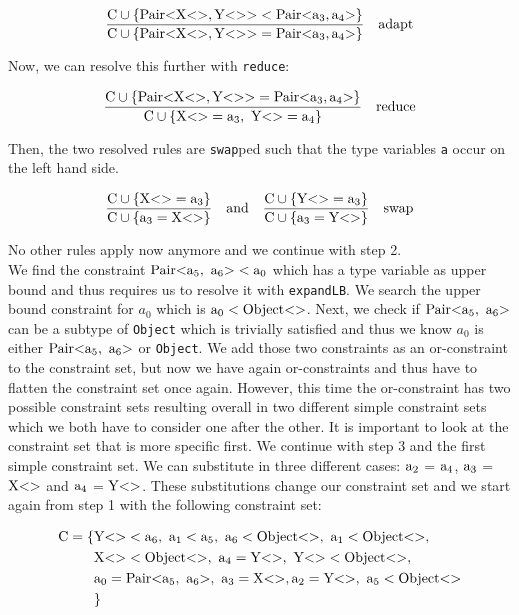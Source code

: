\begin{align*}
    \frac{\text{C} \cup \{ \text{Pair} \text{<} \text{X} \text{<}  \text{>}, \text{Y} \text{<}  \text{>} \text{>} < \text{Pair} \text{<} \text{a}_{3}, \text{a}_{4} \text{>} \} }{\text{C} \cup \{ \text{Pair} \text{<} \text{X} \text{<}  \text{>}, \text{Y} \text{<}  \text{>} \text{>} = \text{Pair} \text{<} \text{a}_{3}, \text{a}_{4} \text{>} \} } \quad \text{adapt}
\end{align*}

Now, we can resolve this further with \verb|reduce|:

\begin{align*}
    \frac{\cand \{ \nvtt{Pair}{\nvtt{X}{}, \nvtt{Y}{}} = \nvtt{Pair}{\fa{3}, \fa{4}} \} }{\cand \{ \nvtt{X}{} = \fa{3}, \ \nvtt{Y}{} = \fa{4} \} } \quad \text{reduce}
\end{align*}

Then, the two resolved rules are \verb|swap|ped such that the type variables \verb|a| occur on the left hand side.

\begin{align*}
    \frac{\text{C} \cup \{ \text{X} \text{<}  \text{>} = \text{a}_{3} \} }{\text{C} \cup \{ \text{a}_{3} = \text{X} \text{<}  \text{>} \} } \quad \text{and} \quad \frac{\text{C} \cup \{ \text{Y} \text{<}  \text{>} = \text{a}_{3} \} }{\text{C} \cup \{ \text{a}_{3} = \text{Y} \text{<}  \text{>} \} } \quad \text{swap}
\end{align*}

No other rules apply now anymore and we continue with step 2.\\

We find the constraint $\nvtt{Pair}{\fa{5}, \ \fa{6}} < \fa{0}$ which has a type variable as upper bound and thus requires us to resolve it with \verb|expandLB|. We search the upper bound constraint for $a_0$ which is $\text{a}_{0} < \text{Object} \text{<}  \text{>}$.
Next, we check if $\nvtt{Pair}{\fa{5}, \ \fa{6}}$ can be a subtype of \verb|Object| which is trivially satisfied and thus we know $a_0$ is either $\nvtt{Pair}{\fa{5}, \ \fa{6}}$ or \verb|Object|. We add those two constraints as an or-constraint
to the constraint set, but now we have again or-constraints and thus have to flatten the constraint set once again. However, this time the or-constraint has two possible constraint sets resulting overall in two different simple constraint sets which we both have to consider one after the other.
It is important to look at the constraint set that is more specific first. We continue with step 3 and the first simple constraint set. We can substitute in three different cases: $\text{a}_{2}$ = $\text{a}_{4}$, $\text{a}_{3}$ = $\text{X} \text{<}  \text{>}$ and $\text{a}_{4}$ = $\text{Y} \text{<}  \text{>}$.
These substitutions change our constraint set and we start again from step 1 with the following constraint set:

\begin{align*}
    \text{C} = \{& \nvtt{Y}{} < \fa{6}, \ \fa{1} < \fa{5}, \ \fa{6} < \nvtt{Object}{}, \ \fa{1} < \nvtt{Object}{}, \\
    &\nvtt{X}{} < \nvtt{Object}{}, \ \fa{4} = \nvtt{Y}{}, \ \nvtt{Y}{} < \nvtt{Object}{}, \\
    &\fa{0} = \nvtt{Pair}{\fa{5}, \ \fa{6}}, \ \fa{3} = \nvtt{X}{}, \fa{2} = \nvtt{Y}{}, \ \fa{5} < \nvtt{Object}{} \\
    &\}
\end{align*}

